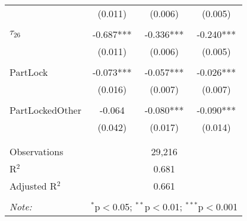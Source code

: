 \begin{tabular}{@{\extracolsep{-0pt}}lccc}
                &  (0.011)  &  (0.006)  &  (0.005)  \\
                &           &           &           \\[-2.1ex]
$\tau_{26}$     & -0.687*** & -0.336*** & -0.240*** \\
                &  (0.011)  &  (0.006)  &  (0.005)  \\
                &           &           &           \\[-2.1ex]
PartLock        & -0.073*** & -0.057*** & -0.026*** \\
                &  (0.016)  &  (0.007)  &  (0.007)  \\
                &           &           &           \\[-2.1ex]
PartLockedOther &   -0.064  & -0.080*** & -0.090*** \\
                &  (0.042)  &  (0.017)  &  (0.014)  \\
                &           &           &           \\[-2.1ex]

\hline \\[-1.8ex] 
Observations     & \multicolumn{3}{c}{29,216} \\ 
R$^{2}$          & \multicolumn{3}{c}{0.681 } \\ 
Adjusted R$^{2}$ & \multicolumn{3}{c}{0.661 } \\ 
\hline 
\hline \\[-1.8ex] 
\textit{Note:}  & \multicolumn{3}{r}{$^{*}$p$<$0.05; $^{**}$p$<$0.01; $^{***}$p$<$0.001} \\ 
\end{tabular} 